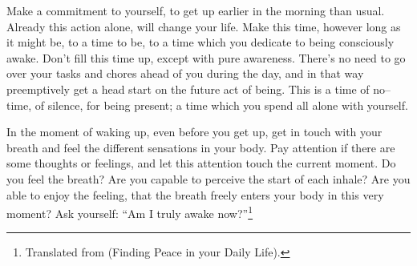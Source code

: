 \documentclass[../main.tex]{subfiles}
\begin{document}
\label{Ex:WakingUp}

Make a commitment to yourself, to get up earlier in the morning than usual.
Already this action alone, will change your life.
Make this time, however long as it might be, to a time to be, to a time which you dedicate to being consciously awake.
Don't fill this time up, except with pure awareness.
There's no need to go over your tasks and chores ahead of you during the day, and in that way preemptively get a head start on the future act of being.
This is a time of no--time, of silence, for being present; a time which you spend all alone with yourself.

In the moment of waking up, even before you get up, get in touch with your breath and feel the different sensations in your body.
Pay attention if there are some thoughts or feelings, and let this attention touch the current moment.
Do you feel the breath?
Are you capable to perceive the start of each inhale?
Are you able to enjoy the feeling, that the breath freely enters your body in this very moment?
Ask yourself: ``Am I truly awake now?''\footnote{Translated from\cite{AlltagRuhe} (Finding Peace in your Daily Life).}
\end{document}
